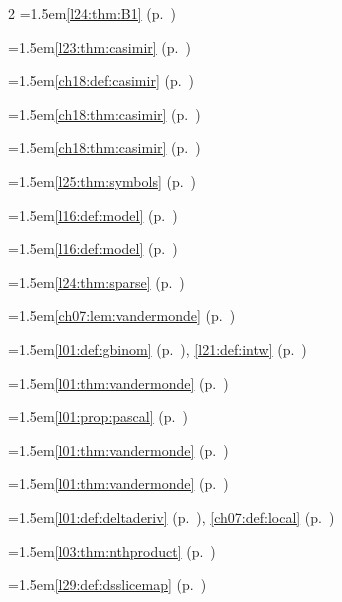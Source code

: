 \begin{multicols}{2}
\hangindent=1.5em\quad \ref{l24:thm:B1} (p.~\pageref{l24:thm:B1})\par
\hangindent=1.5em\quad \ref{l23:thm:casimir} (p.~\pageref{l23:thm:casimir})\par
\hangindent=1.5em\quad \ref{ch18:def:casimir} (p.~\pageref{ch18:def:casimir})\par
\hangindent=1.5em\quad \ref{ch18:thm:casimir} (p.~\pageref{ch18:thm:casimir})\par
\hangindent=1.5em\quad \ref{ch18:thm:casimir} (p.~\pageref{ch18:thm:casimir})\par
\hangindent=1.5em\quad \ref{l25:thm:symbols} (p.~\pageref{l25:thm:symbols})\par
\hangindent=1.5em\quad \ref{l16:def:model} (p.~\pageref{l16:def:model})\par
\hangindent=1.5em\quad \ref{l16:def:model} (p.~\pageref{l16:def:model})\par
\hangindent=1.5em\quad \ref{l24:thm:sparse} (p.~\pageref{l24:thm:sparse})\par
\hangindent=1.5em\quad \ref{ch07:lem:vandermonde} (p.~\pageref{ch07:lem:vandermonde})\par
\hangindent=1.5em\quad \ref{l01:def:gbinom} (p.~\pageref{l01:def:gbinom}), \ref{l21:def:intw} (p.~\pageref{l21:def:intw})\par
\hangindent=1.5em\quad \ref{l01:thm:vandermonde} (p.~\pageref{l01:thm:vandermonde})\par
\hangindent=1.5em\quad \ref{l01:prop:pascal} (p.~\pageref{l01:prop:pascal})\par
\hangindent=1.5em\quad \ref{l01:thm:vandermonde} (p.~\pageref{l01:thm:vandermonde})\par
\hangindent=1.5em\quad \ref{l01:thm:vandermonde} (p.~\pageref{l01:thm:vandermonde})\par
\hangindent=1.5em\quad \ref{l01:def:deltaderiv} (p.~\pageref{l01:def:deltaderiv}), \ref{ch07:def:local} (p.~\pageref{ch07:def:local})\par
\hangindent=1.5em\quad \ref{l03:thm:nthproduct} (p.~\pageref{l03:thm:nthproduct})\par
\hangindent=1.5em\quad \ref{l29:def:dsslicemap} (p.~\pageref{l29:def:dsslicemap})\par

\end{multicols}
